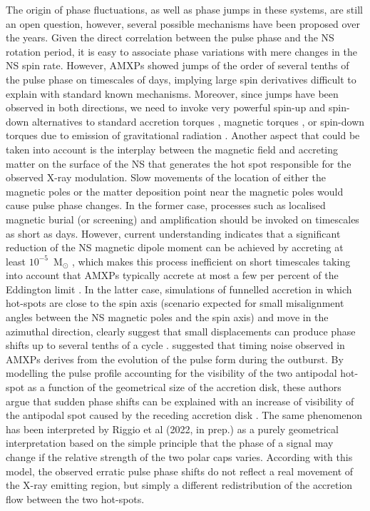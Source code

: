\documentclass[fleqn,usenatbib]{mnras}
\begin{document}
The origin of phase fluctuations, as well as phase jumps in these systems, are still an open question, however, several possible mechanisms have been proposed over the years. Given the direct correlation between the pulse phase and the NS rotation period, it is easy to associate phase variations with mere changes in the NS spin rate. However, AMXPs showed jumps of the order of several tenths of the pulse phase on timescales of days, implying large spin derivatives difficult to explain with standard known mechanisms. Moreover, since jumps have been observed in both directions, we need to invoke very powerful spin-up and spin-down alternatives to standard accretion torques \citep[see e.g.,][]{Lamb:1978uf,Ghosh:1979ws}, magnetic torques \citep[see e.g.,][]{Wang95,Rappaport:2004tr,Kluzniak07}, or spin-down torques due to emission of gravitational radiation \citep[see e.g.,][]{Bildsten:1998wb}.
Another aspect that could be taken into account is the interplay between the magnetic field and accreting matter on the surface of the NS that generates the hot spot responsible for the observed X-ray modulation. Slow movements of the location of either the magnetic poles or the matter deposition point near the magnetic poles would cause pulse phase changes. In the former case, processes such as localised magnetic burial (or screening) and amplification should be invoked on timescales as short as days. However, current understanding indicates that a significant reduction of the NS magnetic dipole moment can be achieved by accreting at least $10^{-5}$~M$_\odot$ \citep{Payne:2004wj}, which makes this process inefficient on short timescales taking into account that AMXPs typically accrete at most a few per percent of the Eddington limit \citep[see e.g.,][]{Di-Salvo:2020va,Patruno:2021vs}. In the latter case, simulations of funnelled accretion in which hot-spots are close to the spin axis (scenario expected for small misalignment angles between the NS magnetic poles and the spin axis) and move in the azimuthal direction, clearly suggest that small displacements can produce phase shifts up to several tenths of a cycle \citep[see e.g.,][and references therein]{Lamb:2009wf}.     
\citet{Poutanen:2009wb} suggested that timing noise observed in AMXPs derives from the evolution of the pulse form during the outburst. By modelling the pulse profile accounting for the visibility of the two antipodal hot-spot as a function of the geometrical size of the accretion disk, these authors argue that sudden phase shifts can be explained with an increase of visibility of the antipodal spot caused by the receding accretion disk \textbf{\citep[see e.g., the 2002 outburst of SAX J1808.4$-$3658;][]{Poutanen:2009wb}}. The same phenomenon has been interpreted by Riggio et al (2022, in prep.) as a purely geometrical interpretation based on the simple principle that the phase of a signal may change if the relative strength of the two polar caps varies. According with this model, the observed erratic pulse phase shifts do not reflect a real movement of the X-ray emitting region, but simply a different redistribution of the accretion flow between the two hot-spots.
\end{document}
